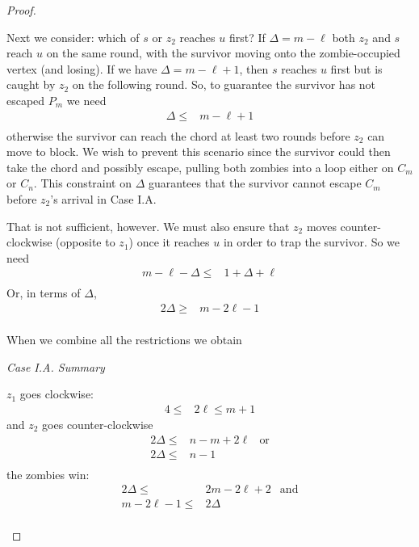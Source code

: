 \begin{proof}
\begin{description}
  Next we consider: which of $s$ or $z_2$ reaches $u$ first?
  If $\Delta = m - \ell$ both $z_2$ and $s$ reach $u$ on the same round,
  with the survivor moving onto the zombie-occupied vertex (and losing).
  If we have $\Delta = m - \ell + 1$, then $s$ reaches $u$ first
  but is caught by $z_2$ on the following round.
  So, to guarantee the survivor has not escaped $P_m$ we need
  \begin{align*}
   \Delta \leq & m- \ell + 1 \\
  \end{align*}
  otherwise the survivor can reach the chord at least two rounds
  before $z_2$ can move to block. We wish to prevent this scenario since
  the survivor could then take the chord and possibly escape, pulling
  both zombies into a loop either on $C_{m}$ or $C_{n}$.
  This constraint on $\Delta$ guarantees that the survivor cannot
  escape $C_m$ before $z_2$'s arrival in Case I.A.

  That is not sufficient, however. We must also ensure that $z_2$ moves
  counter-clockwise (opposite to $z_1$) once it reaches $u$ in order to trap the
  survivor. So we need
  \begin{align*}
   m - \ell - \Delta \leq & 1 + \Delta + \ell \\
\end{align*}
Or, in terms of $\Delta$,
\begin{align*}
   2 \Delta \geq          & m - 2\ell  -1     \\
  \end{align*}

  When we combine all the restrictions we obtain

  \textit{Case I.A. Summary}

  $z_1$ goes clockwise:
  \begin{align*}
   4 \leq & 2 \ell \leq m + 1
  \end{align*}
  and $z_2$ goes counter-clockwise
  \begin{align*}
   2 \Delta \leq & n - m + 2\ell & \text{or} \\
   2 \Delta \leq & n - 1                     \\
  \end{align*}
  the zombies win:
  \begin{align*}
   2 \Delta \leq      & 2 m- 2 \ell + 2 & \text{and} \\
   m - 2\ell  -1 \leq & 2 \Delta                     \\
  \end{align*}


\end{description}
\end{proof}
